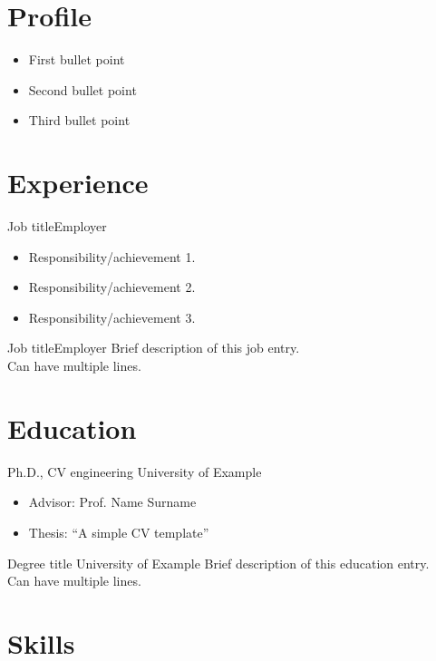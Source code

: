 \documentclass[a4paper, 11pt]{letter}
\begin{document}
\contact


\section{Profile}

\begin{itemize}
    \item First bullet point
    \item Second bullet point
    \item Third bullet point
\end{itemize}


\section{Experience}

{Job title}{Employer}{
\begin{itemize}
    \item Responsibility/achievement 1.
    \item Responsibility/achievement 2.
    \item Responsibility/achievement 3.
\end{itemize}
}

{Job title}{Employer}{
Brief description of this job entry.\\
Can have multiple lines.
}


\section{Education}

{Ph.D., CV engineering}
{University of Example}
{\begin{itemize}
    \item Advisor: Prof. Name Surname
    \item Thesis: ``A simple CV template''
\end{itemize}
}

{Degree title}
{University of Example}
{Brief description of this education entry.\\
Can have multiple lines.
}


\section{Skills}

\end{document}
